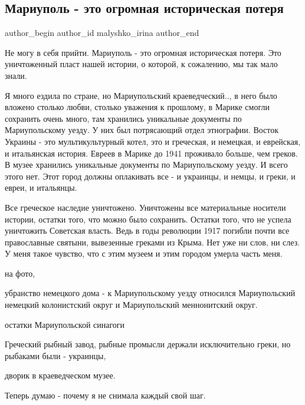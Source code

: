  
 
 
 
 
 
\subsection{Мариуполь - это огромная историческая потеря}
\label{sec:17_04_2022.fb.malyshko_irina.1.mariupol_muzej}
 
\ifcmt
 author_begin
   author_id malyshko_irina
 author_end
\fi

Не могу в себя прийти. Мариуполь - это огромная историческая потеря. Это
уничтоженный пласт нашей истории, о которой, к сожалению, мы так мало знали. 

Я много ездила по стране, но Мариупольский краеведческий.., в него было вложено
столько любви, столько уважения к прошлому, в Марике смогли сохранить очень
много, там хранились уникальные документы по Мариупольскому уезду. У них был
потрясающий отдел этнографии. Восток Украины - это мультикультурный котел,  это
и греческая, и немецкая, и еврейская, и итальянская история. Евреев в Марике до
1941 проживало больше, чем греков. В музее хранились уникальные документы по
Мариупольскому уезду.  И всего этого нет. Этот город должны оплакивать все - и
украинцы, и немцы, и греки, и евреи, и итальянцы. 


Все греческое наследие уничтожено. Уничтожены все материальные носители
истории, остатки того, что можно было сохранить.  Остатки того, что не успела
уничтожить Советская власть. Ведь в годы революции 1917 погибли почти все
православные святыни, вывезенные греками из Крыма. Нет уже ни слов, ни слез.  У
меня такое чувство, что с этим музеем  и этим городом умерла часть меня.


на фото, 

убранство немецкого  дома - к Мариупольскому уезду относился Мариупольский
немецкий колонистский округ и Мариупольский меннонитский округ. 

остатки Мариупольской синагоги

Греческий рыбный завод, рыбные промысли держали исключительно греки, но
рыбаками были - украинцы,

дворик в краеведческом музее.

Теперь думаю - почему я не снимала каждый свой шаг.

